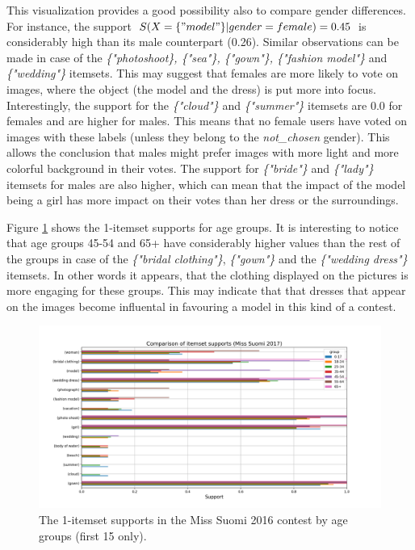 This visualization provides a good possibility also to compare gender differences. For instance, the support $S(X=\{"model"\}|gender=female)=0.45$ is considerably high than its male counterpart (0.26). Similar observations can be made in case of the \textit{\{"photo\:shoot\}, \{"sea"\}, \{"gown"\}, \{"fashion model"\}} and \textit{\{"wedding"\}} itemsets. This may suggest that females are more likely to vote on images, where the object (the model and the dress) is put more into focus. Interestingly, the support for the \textit{\{"cloud"\}} and \textit{\{"summer"\}} itemsets are 0.0 for females and are higher for males. This means that no female users have voted on images with these labels (unless they belong to the \textit{not\_chosen} gender). This allows the conclusion that males might prefer images with more light and more colorful background in their votes. The support for \textit{\{"bride"\}} and \textit{\{"lady"\}} itemsets for males are also higher, which can mean that the impact of the model being a girl has more impact on their votes than her dress or the surroundings.

Figure \ref{itemset_supports-age_group-Miss_Helsinki-1_itemset} shows the 1-itemset supports for age groups. It is interesting to notice that age groups 45-54 and 65+ have considerably higher values than the rest of the groups in case of the \textit{\{"bridal clothing"\}}, \textit{\{"gown"\}} and the \textit{\{"wedding dress"\}} itemsets. In other words it appears, that the clothing displayed on the pictures is more engaging for these groups. This may indicate that that dresses that appear on the images become influental in favouring a model in this kind of a contest. 

\begin{figure}[h] 
    \begin{center}
        \includegraphics[width=1.0\textwidth]{Images/itemset_supports-age_group-Miss_Helsinki-1_itemset.png}
        \caption{The 1-itemset supports in the Miss Suomi 2016 contest by age groups (first 15 only).}
        \label{itemset_supports-age_group-Miss_Helsinki-1_itemset}
    \end{center}
\end{figure}

